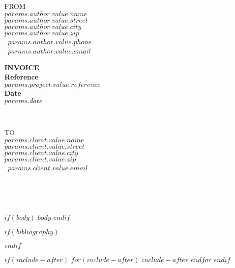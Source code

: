 \documentclass[
11pt,
a4paper,
twoside,
]{article}
\begin{document}
\vspace{0pt}
\begin{minipage}[t]{0.5\textwidth}
  \vspace{0pt}
  \begin{flushleft}
    \uppercase{From}                      \\
    \textbf{$params.author.value.name$}   \\
    $params.author.value.street$          \\
    $params.author.value.city$            \\
    $params.author.value.zip$             \\
    \faPhone\ $params.author.value.phone$ \\
    \faEnvelopeO\ $params.author.value.email$
  \end{flushleft}
\end{minipage}
\hfill
\begin{minipage}[t]{0.5\textwidth}
  \vspace{0pt}
  \begin{flushright}
    {\LARGE\bfseries\uppercase{Invoice}}\\
    {\bfseries Reference}               \\
    $params.project.value.reference$                   \\
    {\bfseries Date}                    \\
    $params.date$
  \end{flushright}
\end{minipage}\\[\baselineskip]
\begin{minipage}{1\textwidth}
  \begin{flushleft}
    \uppercase{To}\\
    \textbf{$params.client.value.name$}\\
    $params.client.value.street$\\
    $params.client.value.city$\\
    $params.client.value.zip$\\
    \faEnvelopeO\ $params.client.value.email$
  \end{flushleft}
\end{minipage}\\

\begin{center}
  {\Large\bfseries{}}\\
  {\large\itshape{}}
\end{center}

$if(body)$
$body$
$endif$

$if(bibliography)$
\clearpage

$endif$

$if(include-after)$
\clearpage
$for(include-after)$
$include-after$
$endfor$
$endif$
\end{document}
